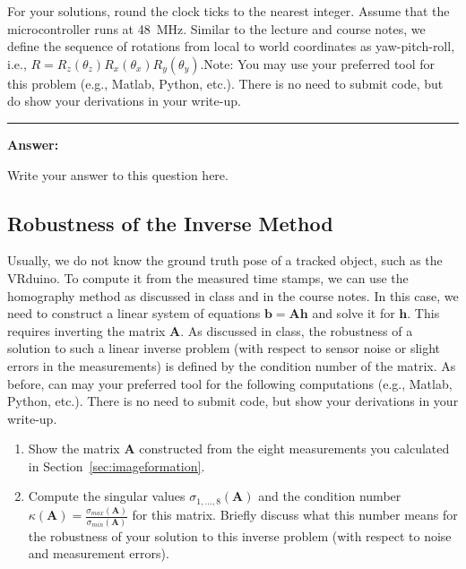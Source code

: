 \documentclass[conference]{styles/acmsiggraph}
\newenvironment{answer}{}{}
\newcommand{\points}[1]{\hfill \normalfont{(\textit{#1pts})}}
\newcommand{\pointsin}[1]{\normalfont{(\textit{#1pts})}}
\begin{document}
For your solutions, round the clock ticks to the nearest integer. Assume that the microcontroller runs at 48~MHz. Similar to the lecture and course notes, we define the sequence of rotations from local to world coordinates as yaw-pitch-roll, i.e., $R= R_z \left( \theta_z \right) R_x \left( \theta_x \right) R_y \left( \theta_y \right)$.Note: You may use your preferred tool for this problem (e.g., Matlab, Python, etc.). There is no need to submit code, but do show your derivations in your write-up.


\begin{answer}
\rule{\textwidth}{0.4pt}
\textbf{Answer:}

Write your answer to this question here.

\end{answer}

\newpage
\subsection{Robustness of the Inverse Method \points{15}}

Usually, we do not know the ground truth pose of a tracked object, such as the VRduino. To compute it from the measured time stamps, we can use the homography method as discussed in class and in the course notes. In this case, we need to construct a linear system of equations $\boldsymbol{b}=\boldsymbol{A} \boldsymbol{h}$ and solve it for $\boldsymbol{h}$. This requires inverting the matrix $\boldsymbol{A}$. As discussed in class, the robustness of a solution to such a linear inverse problem (with respect to sensor noise or slight errors in the measurements) is defined by the condition number of the matrix. As before, can may your preferred tool for the following computations (e.g., Matlab, Python, etc.). There is no need to submit code, but show your derivations in your write-up.

\begin{enumerate}[label=(\roman*)]
\item Show the matrix $\boldsymbol{A}$ constructed from the eight measurements you calculated in Section~\ref{sec:imageformation}. \pointsin{5}
\item Compute the singular values $\sigma_{1,\ldots,8} \left( \boldsymbol{A} \right)$ and the condition number $\kappa \left( \boldsymbol{A} \right) = \frac{ \sigma_{max} \left( \boldsymbol{A} \right) }{ \sigma_{min} \left( \boldsymbol{A} \right) }$ for this matrix. Briefly discuss what this number means for the robustness of your solution to this inverse problem (with respect to noise and measurement errors). \pointsin{10}
\end{enumerate}
\end{document}
